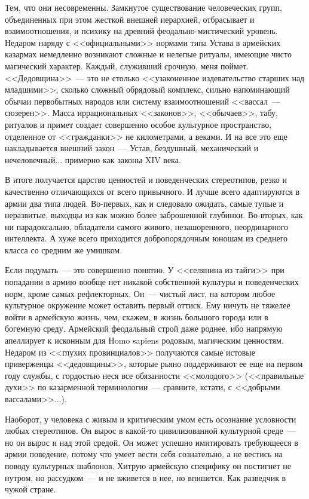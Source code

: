 \documentclass{scrbook}
\newcommand{\flqq}{<<}
\newcommand{\frqq}{>>}
\newcommand{\mdash}{~--- }
\begin{document}
Тем, что они несовременны. Замкнутое существование человеческих групп, объединенных при этом жесткой внешней иерархией, отбрасывает и взаимоотношения, и психику на древний феодально-мистический уровень. Недаром наряду с {\flqq}официальными{\frqq} нормами типа Устава в армейских казармах немедленно возникают сложные и нелепые ритуалы, имеющие чисто магический характер. Каждый, служивший срочную, меня поймет. {\flqq}Дедовщина{\frqq}{\mdash}это не столько {\flqq}узаконенное издевательство старших над младшими{\frqq}, сколько сложный обрядовый комплекс, сильно напоминающий обычаи первобытных народов или систему взаимоотношений {\flqq}вассал{\mdash}сюзерен{\frqq}. Масса иррациональных {\flqq}законов{\frqq}, {\flqq}обычаев{\frqq}, табу, ритуалов и примет создает совершенно особое культурное пространство, отделенное от {\flqq}гражданки{\frqq} не километрами, а веками. И на все это еще накладывается внешний закон{\mdash}Устав, бездушный, механический и нечеловечный... примерно как законы XIV века.

В итоге получается царство ценностей и поведенческих стереотипов, резко и качественно отличающихся от всего привычного. И лучше всего адаптируются в армии два типа людей. Во-первых, как и следовало ожидать, самые тупые и неразвитые, выходцы из как можно более заброшенной глубинки. Во-вторых, как ни парадоксально, обладатели самого живого, незашоренного, неординарного интеллекта. А хуже всего приходится добропорядочным юношам из среднего класса со средним же умишком.

Если подумать{\mdash}это совершенно понятно. У {\flqq}селянина из тайги{\frqq} при попадании в армию вообще нет никакой собственной культуры и поведенческих норм, кроме самых рефлекторных. Он{\mdash}чистый лист, на котором любое культурное окружение может оставить первый оттиск. Ему ничуть не тяжелее войти в армейскую жизнь, чем, скажем, в жизнь большого города или в богемную среду. Армейский феодальный строй даже роднее, ибо напрямую апеллирует к исконным для Homo sapiens родовым, магическим ценностям. Недаром из {\flqq}глухих провинциалов{\frqq} получаются самые истовые приверженцы {\flqq}дедовщины{\frqq}, которые рьяно поддерживают ее еще на первом году службы, с гордостью неся все обязанности {\flqq}молодого{\frqq} ({\flqq}правильные духи{\frqq} по казарменной терминологии{\mdash}сравните, кстати, с {\flqq}добрыми вассалами{\frqq}...).

Наоборот, у человека с живым и критическим умом есть осознание условности любых стереотипов. Он вырос в какой-то цивилизованной культурной среде{\mdash}но он вырос и над этой средой. Он может успешно имитировать требующееся в армии поведение, потому что умеет вести себя сознательно, а не вестись на поводу культурных шаблонов. Хитрую армейскую специфику он постигнет не нутром, но рассудком{\mdash}и не вживется в нее, но впишется. Как разведчик в чужой стране.
\end{document}
